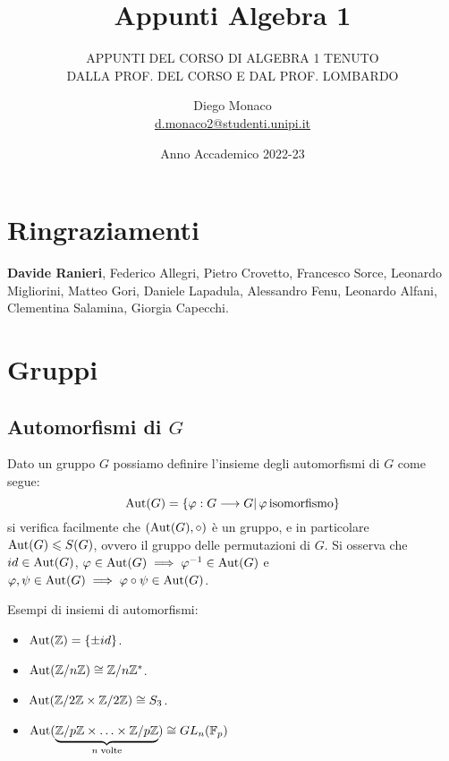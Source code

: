 \documentclass[11pt]{scrartcl}
\begin{document}
\title{Appunti Algebra 1}
\subtitle{\large\normalfont\rmfamily\scshape APPUNTI DEL CORSO DI ALGEBRA 1 TENUTO\\ DALLA PROF. DEL CORSO E DAL PROF. LOMBARDO}
\author{Diego Monaco \\ \textnormal{\href{d.monaco2@studenti.unipi.it}{d.monaco2@studenti.unipi.it}}}
\date{Anno Accademico 2022-23}
\maketitle
\newpage

\tableofcontents
\eject
\newpage

\section*{Ringraziamenti}
\textbf{Davide Ranieri}, Federico Allegri, Pietro Crovetto, Francesco Sorce, Leonardo Migliorini, Matteo Gori, Daniele Lapadula, Alessandro Fenu,
Leonardo Alfani, Clementina Salamina, Giorgia Capecchi.

\newpage
\section{Gruppi}
\subsection{Automorfismi di $G$}
Dato un gruppo $G$ possiamo definire l'insieme degli automorfismi di $G$ come segue:
    \[ \operatorname{Aut}(G) = \{\varphi : G \longrightarrow G |\, \varphi \, \text{isomorfismo}\}
        \]
si verifica facilmente che $(\operatorname{Aut}(G), \circ)$ è un gruppo, e in particolare $\operatorname{Aut}(G) \leqslant S(G)$,
ovvero il gruppo delle permutazioni di $G$. Si osserva che $id \in \operatorname{Aut}(G)$, $\varphi \in \operatorname{Aut}(G) \implies 
\varphi^{-1} \in \operatorname{Aut}(G)$ e $\varphi,\psi \in \operatorname{Aut}(G) \implies \varphi \circ \psi \in \operatorname{Aut}(G)$.

\begin{example}
    Esempi di insiemi di automorfismi:
        \begin{itemize}
            \item $\operatorname{Aut}(\mathbb Z) = \{\pm id\}$.
            \item $\operatorname{Aut}({\mathbb Z}/n{\mathbb Z}) \cong {\mathbb Z}/n{\mathbb Z}^*$.
            \item $\operatorname{Aut}(\mathbb{Z}/{2}\mathbb{Z} \times \mathbb{Z}/{2}\mathbb{Z}) \cong S_3$.
            \item $\operatorname{Aut}(\underbrace{{\mathbb Z}/p{\mathbb Z} \times \ldots \times {\mathbb Z}/p{\mathbb Z}}_{n \;\text{volte}}) \cong GL_n({\mathbb F}_p)$
        \end{itemize}
\end{example}
\end{document}
